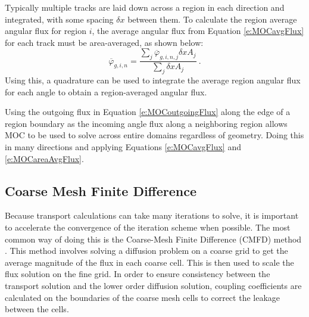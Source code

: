 Typically multiple tracks are laid down across a region in each direction and integrated, with some spacing $\delta x$ between them.  To calculate the region average angular flux for region $i$, the average angular flux from Equation \ref{e:MOCavgFlux} for each track must be area-averaged, as shown below:
\begin{equation}\label{e:MOCareaAvgFlux}
\overline{\varphi}_{g,i,n} = \frac{\sum_j \overline{\varphi}_{g,i,n,j} \delta x A_j}{\sum_j \delta x A_j}\ .
\end{equation}
Using this, a quadrature can be used to integrate the average region angular flux for each angle to obtain a region-averaged angular flux.

Using the outgoing flux in Equation \ref{e:MOCoutgoingFlux} along the edge of a region boundary as the incoming angle flux along a neighboring region allows MOC to be used to solve across entire domains regardless of geometry.  Doing this in many directions and applying Equations \ref{e:MOCavgFlux} and \ref{e:MOCareaAvgFlux}.

\subsection{Coarse Mesh Finite Difference}\label{ss:CMFD}

Because transport calculations can take many iterations to solve, it is important to accelerate the convergence of the iteration scheme when possible.  The most common way of doing this is the Coarse-Mesh Finite Difference (CMFD) method \cite{SmithCMFDOrig}.  This method involves solving a diffusion problem on a coarse grid to get the average magnitude of the flux in each coarse cell.  This is then used to scale the flux solution on the fine grid.  In order to ensure consistency between the transport solution and the lower order diffusion solution, coupling coefficients are calculated on the boundaries of the coarse mesh cells to correct the leakage between the cells.

